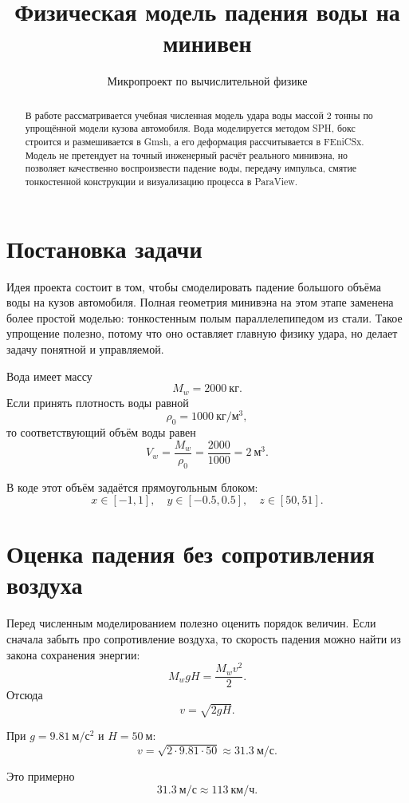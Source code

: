 \documentclass[12pt,a4paper]{article}
\title{Физическая модель падения воды на минивен}
\author{Микропроект по вычислительной физике}
\date{}
\begin{document}
\maketitle

\begin{abstract}
В работе рассматривается учебная численная модель удара воды массой
\(2\) тонны по упрощённой модели кузова автомобиля. Вода моделируется методом
SPH, бокс строится и размешивается в Gmsh, а его деформация рассчитывается в
FEniCSx. Модель не претендует на точный инженерный расчёт реального минивэна,
но позволяет качественно воспроизвести падение воды, передачу импульса, смятие
тонкостенной конструкции и визуализацию процесса в ParaView.
\end{abstract}

\section{Постановка задачи}

Идея проекта состоит в том, чтобы смоделировать падение большого объёма воды на
кузов автомобиля. Полная геометрия минивэна на этом этапе заменена более простой
моделью: тонкостенным полым параллелепипедом из стали. Такое упрощение полезно,
потому что оно оставляет главную физику удара, но делает задачу понятной и
управляемой.

Вода имеет массу
\[
M_w = 2000 \ \text{кг}.
\]
Если принять плотность воды равной
\[
\rho_0 = 1000 \ \text{кг}/\text{м}^3,
\]
то соответствующий объём воды равен
\[
V_w = \frac{M_w}{\rho_0}
=
\frac{2000}{1000}
=
2 \ \text{м}^3.
\]

В коде этот объём задаётся прямоугольным блоком:
\[
x \in [-1,1], \quad
y \in [-0.5,0.5], \quad
z \in [50,51].
\]

\section{Оценка падения без сопротивления воздуха}

Перед численным моделированием полезно оценить порядок величин. Если сначала
забыть про сопротивление воздуха, то скорость падения можно найти из закона
сохранения энергии:
\[
M_w g H = \frac{M_w v^2}{2}.
\]
Отсюда
\[
v = \sqrt{2gH}.
\]

При \(g=9.81 \ \text{м}/\text{с}^2\) и \(H=50 \ \text{м}\):
\[
v = \sqrt{2 \cdot 9.81 \cdot 50}
\approx 31.3 \ \text{м}/\text{с}.
\]

Это примерно
\[
31.3 \ \text{м}/\text{с}
\approx 113 \ \text{км}/\text{ч}.
\]
\end{document}
